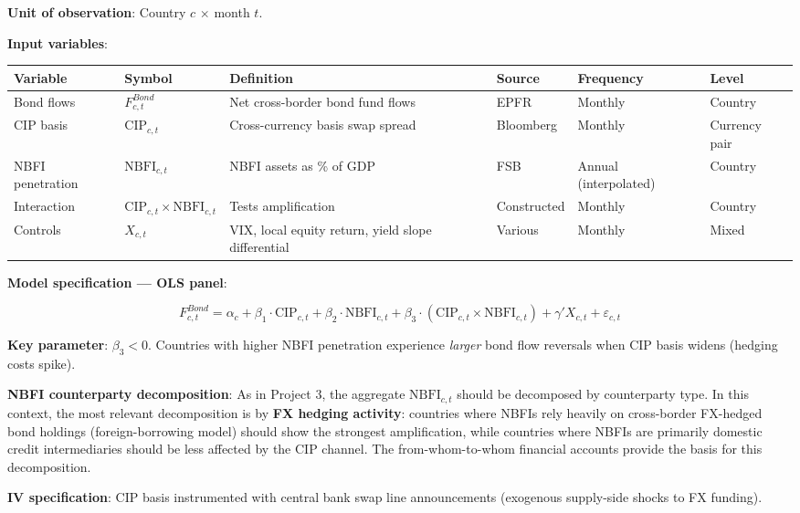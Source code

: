 \documentclass[11pt,a4paper]{article}
\begin{document}
\textbf{Unit of observation}: Country $c$ $\times$ month $t$.

\textbf{Input variables}:


{\small
\begin{longtable}{|p{}|p{}|p{}|p{}|p{}|p{}|}
\hline
\textbf{Variable} & \textbf{Symbol} & \textbf{Definition} & \textbf{Source} & \textbf{Frequency} & \textbf{Level} \\
\hline
\endhead
Bond flows & $F_{c,t}^{Bond}$ & Net cross-border bond fund flows & EPFR & Monthly & Country \\
\hline
CIP basis & $\text{CIP}_{c,t}$ & Cross-currency basis swap spread & Bloomberg & Monthly & Currency pair \\
\hline
NBFI penetration & $\text{NBFI}_{c,t}$ & NBFI assets as \% of GDP & FSB & Annual (interpolated) & Country \\
\hline
Interaction & $\text{CIP}_{c,t} \times \text{NBFI}_{c,t}$ & Tests amplification & Constructed & Monthly & Country \\
\hline
Controls & $X_{c,t}$ & VIX, local equity return, yield slope differential & Various & Monthly & Mixed \\
\hline
\end{longtable}
}

\textbf{Model specification --- OLS panel}:

\[F_{c,t}^{Bond} = \alpha_c + \beta_1 \cdot \text{CIP}_{c,t} + \beta_2 \cdot \text{NBFI}_{c,t} + \beta_3 \cdot (\text{CIP}_{c,t} \times \text{NBFI}_{c,t}) + \gamma' X_{c,t} + \varepsilon_{c,t}\]

\textbf{Key parameter}: $\beta_3 < 0$. Countries with higher NBFI penetration experience \textit{larger} bond flow reversals when CIP basis widens (hedging costs spike).

\textbf{NBFI counterparty decomposition}: As in Project 3, the aggregate $\text{NBFI}_{c,t}$ should be decomposed by counterparty type. In this context, the most relevant decomposition is by \textbf{FX hedging activity}: countries where NBFIs rely heavily on cross-border FX-hedged bond holdings (foreign-borrowing model) should show the strongest amplification, while countries where NBFIs are primarily domestic credit intermediaries should be less affected by the CIP channel. The from-whom-to-whom financial accounts provide the basis for this decomposition.

\textbf{IV specification}: CIP basis instrumented with central bank swap line announcements (exogenous supply-side shocks to FX funding).
\end{document}
